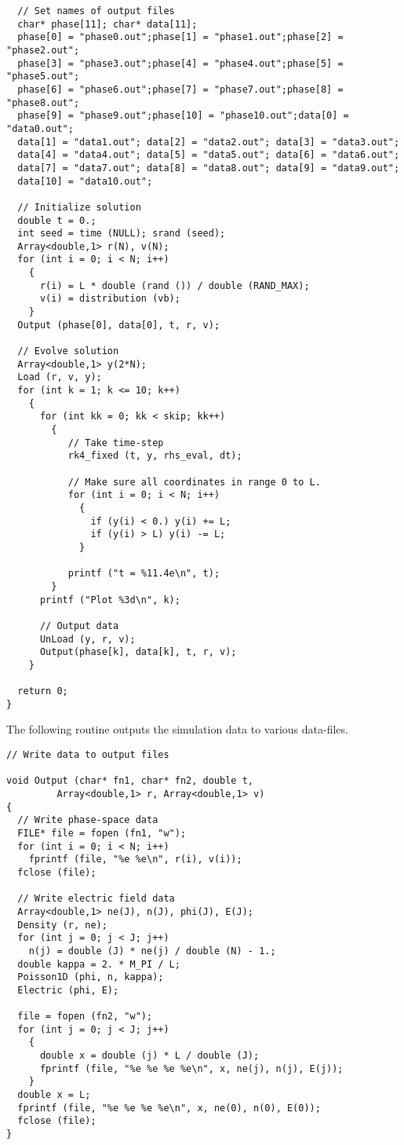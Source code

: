 \begin{verbatim}
  // Set names of output files
  char* phase[11]; char* data[11];
  phase[0] = "phase0.out";phase[1] = "phase1.out";phase[2] = "phase2.out"; 
  phase[3] = "phase3.out";phase[4] = "phase4.out";phase[5] = "phase5.out"; 
  phase[6] = "phase6.out";phase[7] = "phase7.out";phase[8] = "phase8.out";
  phase[9] = "phase9.out";phase[10] = "phase10.out";data[0] = "data0.out";  
  data[1] = "data1.out"; data[2] = "data2.out"; data[3] = "data3.out"; 
  data[4] = "data4.out"; data[5] = "data5.out"; data[6] = "data6.out"; 
  data[7] = "data7.out"; data[8] = "data8.out"; data[9] = "data9.out"; 
  data[10] = "data10.out";

  // Initialize solution
  double t = 0.;
  int seed = time (NULL); srand (seed);
  Array<double,1> r(N), v(N);
  for (int i = 0; i < N; i++)
    {
      r(i) = L * double (rand ()) / double (RAND_MAX);
      v(i) = distribution (vb);
    }
  Output (phase[0], data[0], t, r, v);

  // Evolve solution
  Array<double,1> y(2*N);
  Load (r, v, y);
  for (int k = 1; k <= 10; k++)
    {
      for (int kk = 0; kk < skip; kk++)
        {
           // Take time-step
           rk4_fixed (t, y, rhs_eval, dt);

           // Make sure all coordinates in range 0 to L.
           for (int i = 0; i < N; i++)
             {
               if (y(i) < 0.) y(i) += L;
               if (y(i) > L) y(i) -= L;
             }
	  
           printf ("t = %11.4e\n", t);
        }
      printf ("Plot %3d\n", k);

      // Output data
      UnLoad (y, r, v);
      Output(phase[k], data[k], t, r, v);
    }

  return 0;
}
\end{verbatim}

The following routine outputs the simulation data to various data-files.
\begin{verbatim}
// Write data to output files

void Output (char* fn1, char* fn2, double t,
	     Array<double,1> r, Array<double,1> v)
{  
  // Write phase-space data
  FILE* file = fopen (fn1, "w");
  for (int i = 0; i < N; i++)
    fprintf (file, "%e %e\n", r(i), v(i));
  fclose (file);

  // Write electric field data
  Array<double,1> ne(J), n(J), phi(J), E(J);  
  Density (r, ne);
  for (int j = 0; j < J; j++)
    n(j) = double (J) * ne(j) / double (N) - 1.;
  double kappa = 2. * M_PI / L; 
  Poisson1D (phi, n, kappa);
  Electric (phi, E);

  file = fopen (fn2, "w");
  for (int j = 0; j < J; j++)
    {
      double x = double (j) * L / double (J);
      fprintf (file, "%e %e %e %e\n", x, ne(j), n(j), E(j));
    }
  double x = L;
  fprintf (file, "%e %e %e %e\n", x, ne(0), n(0), E(0));
  fclose (file);
}
\end{verbatim}

